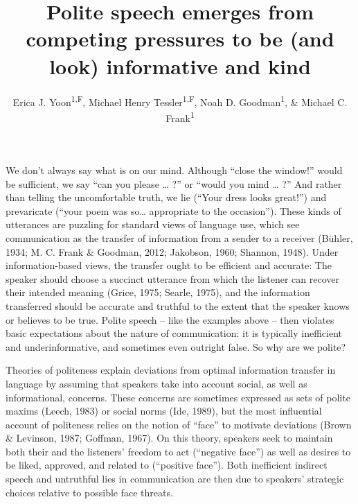\documentclass[floatsintext,man]{apa6}
\title{Polite speech emerges from competing pressures to be (and look)
informative and kind}
\author{Erica J. Yoon\textsuperscript{1,F}, Michael Henry Tessler\textsuperscript{1,F}, Noah D. Goodman\textsuperscript{1}, \& Michael C. Frank\textsuperscript{1}}
\affiliation{
    \vspace{0.5cm}
          \textsuperscript{1} Department of Psychology, Stanford University\\
          \textsuperscript{F} These authors contributed equally to this work.  }
\theoremstyle{definition}
\theoremstyle{definition}
\theoremstyle{definition}
\theoremstyle{remark}
\begin{document}
\maketitle

\setcounter{secnumdepth}{0}



We don't always say what is on our mind. Although \enquote{close the
window!} would be sufficient, we say \enquote{can you please \ldots{} ?}
or \enquote{would you mind \ldots{} ?} And rather than telling the
uncomfortable truth, we lie (\enquote{Your dress looks great!}) and
prevaricate (\enquote{your poem was so\ldots{} appropriate to the
occasion}). These kinds of utterances are puzzling for standard views of
language use, which see communication as the transfer of information
from a sender to a receiver (Bühler, 1934; M. C. Frank \& Goodman, 2012;
Jakobson, 1960; Shannon, 1948). Under information-based views, the
transfer ought to be efficient and accurate: The speaker should choose a
succinct utterance from which the listener can recover their intended
meaning (Grice, 1975; Searle, 1975), and the information transferred
should be accurate and truthful to the extent that the speaker knows or
believes to be true. Polite speech -- like the examples above -- then
violates basic expectations about the nature of communication: it is
typically inefficient and underinformative, and sometimes even outright
false. So why are we polite?

Theories of politeness explain deviations from optimal information
transfer in language by assuming that speakers take into account social,
as well as informational, concerns. These concerns are sometimes
expressed as sets of polite maxims (Leech, 1983) or social norms (Ide,
1989), but the most influential account of politeness relies on the
notion of \enquote{face} to motivate deviations (Brown \& Levinson,
1987; Goffman, 1967). On this theory, speakers seek to maintain both
their and the listeners' freedom to act (\enquote{negative face}) as
well as desires to be liked, approved, and related to (\enquote{positive
face}). Both inefficient indirect speech and untruthful lies in
communication are then due to speakers' strategic choices relative to
possible face threats.
\end{document}
